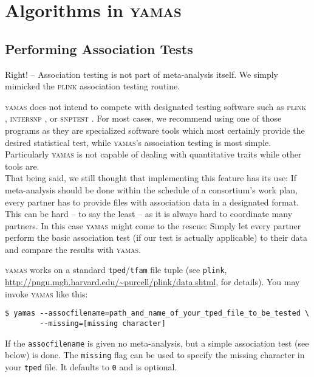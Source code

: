 \chapter[Algorithms]{Algorithms in \textsc{yamas}}
\label{algorithms}

\section{Performing Association Tests}
\label{algo:op:association}

Right! -- Association testing is not part of meta-analysis itself. We simply mimicked the \textsc{plink} \citep{Purcell2007} association testing routine.

\alert{\textsc{yamas} does not intend to compete with designated testing software such as \textsc{plink} \citep{Purcell2007}, \textsc{intersnp} \citep{Herold2009}, or \textsc{snptest} \citep{Consortium2007}. For most cases, we recommend using one of those programs as they are specialized software tools which most certainly provide the desired statistical test, while \textsc{yamas}'s association testing is most simple. Particularly \textsc{yamas} is not capable of dealing with quantitative traits while other tools are.}\\

That being said, we still thought that implementing this feature has its use: If meta-analysis should be done within the schedule of a consortium's work plan, every partner has to provide files with association data in a designated format. This can be hard -- to say the least -- as it is always hard to coordinate many partners. In this case \textsc{yamas} might come to the rescue: Simply let every partner perform the basic association test (if our test is actually applicable) to their data and compare the results with \textsc{yamas}.

\textsc{yamas} works on a standard \texttt{tped}/\texttt{tfam} file tuple (see \texttt{plink}, \url{http://pngu.mgh.harvard.edu/~purcell/plink/data.shtml}, for details). You may invoke \textsc{yamas} like this:

\begin{lstlisting}[style=shell]
$ yamas --assocfilename=path_and_name_of_your_tped_file_to_be_tested \
        --missing=[missing character]
\end{lstlisting}

If the \verb+assocfilename+ is given no meta-analysis, but a simple association test (see below) is done. The \verb+missing+ flag can be used to specify the missing character in your \texttt{tped} file. It defaults to \texttt{0} and is optional.

